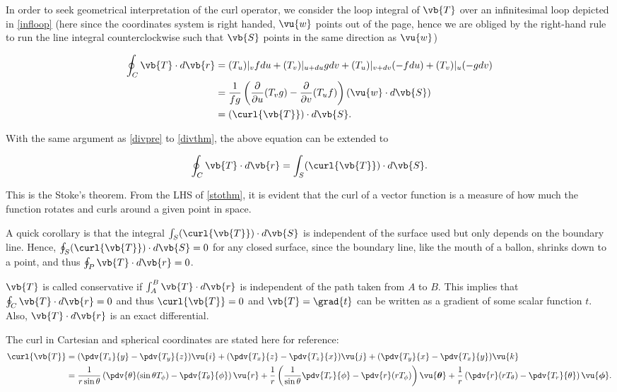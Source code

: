 \documentclass[english,a4paper,12pt]{report}
\begin{document}
In order to seek geometrical interpretation of the curl operator, we consider the loop integral of \(\vb{T}\) over an infinitesimal loop depicted in \cref{infloop} (here since the coordinates system is right handed, \(\vu{w}\) points out of the page, hence we are obliged by the right-hand rule to run the line integral counterclockwise such that \(\vb{S}\) points in the same direction as \(\vu{w}\))
	
\begin{equation} 
	\begin{aligned} 
		\oint_{C} \vb{T} \cdot d\vb{r} &= (T_u)|_{v}fdu + (T_v)|_{u+du}gdv + (T_u)|_{v+dv}(-fdu) + (T_v)|_{u}(-gdv) \\ &= \frac{1}{fg}\left(\frac{\partial }{\partial u} (T_{v} g) - \frac{\partial }{\partial v} (T_{u}f)\right)(\vu{w} \cdot d\vb{S}) \\ &= (\curl{\vb{T} } ) \cdot d\vb{S} . 
	\end{aligned} 
\end{equation}

With the same argument as \cref{divpre}  to \cref{divthm}, the above equation can be extended to
	
\begin{equation} 
	\oint_{C} \vb{T} \cdot d\vb{r} = \int_{S} (\curl{\vb{T}}) \cdot d\vb{S}. \label{stothm} 
\end{equation}
	
This is the Stoke's theorem. From the LHS of \cref{stothm}, it is evident that the curl of a vector function is a measure of how much the function rotates and curls around a given point in space.


A quick corollary is that the integral \(\int_{S} (\curl{\vb{T}}) \cdot d\vb{S}\) is independent of the surface used but only depends on the boundary line. Hence, \( \oint_{S} (\curl{\vb{T}}) \cdot d\vb{S} = 0\) for any closed surface, since the boundary line, like the mouth of a ballon, shrinks down to a point, and thus \(\oint_{P} \vb{T} \cdot d\vb{r} = 0\).

\(\vb{T} \) is called conservative if \(\int_{A}^{B}  \vb{T} \cdot d\vb{r}  \) is independent of the path taken from \(A\) to \(B\). This implies that \( \oint_{C} \vb{T} \cdot d\vb{r} = 0\) and thus \(\curl{\vb{T} } = 0\) and \(\vb{T} = \grad{t} \) can be written as a gradient of some scalar function \(t\). Also, \(\vb{T} \cdot d\vb{r} \) is an exact differential.      

The curl in Cartesian and spherical coordinates are stated here for reference:
\begin{equation} 
	\begin{aligned}
	\curl{\vb{T}} &= (\pdv{T_z}{y} - \pdv{T_y}{z})\vu{i} + (\pdv{T_x}{z} - \pdv{T_z}{x})\vu{j} + (\pdv{T_y}{x} - \pdv{T_x}{y})\vu{k} \\ &= \frac{1}{r\sin{\theta}}\left(\pdv{\theta}(\sin{\theta}T_{\phi}) - \pdv{T_{\theta}}{\phi}\right)\vu{r} + \frac{1}{r}\left(\frac{1}{\sin{\theta}}\pdv{T_r}{\phi} - \pdv{r}(rT_{\phi})\right)\vu{\boldsymbol{\theta } } + \frac{1}{r}\left(\pdv{r}(rT_{\theta}) - \pdv{T_r}{\theta}\right)\vu{\boldsymbol{\phi } }. 
    \end{aligned}
\end{equation}
	
\end{document}
